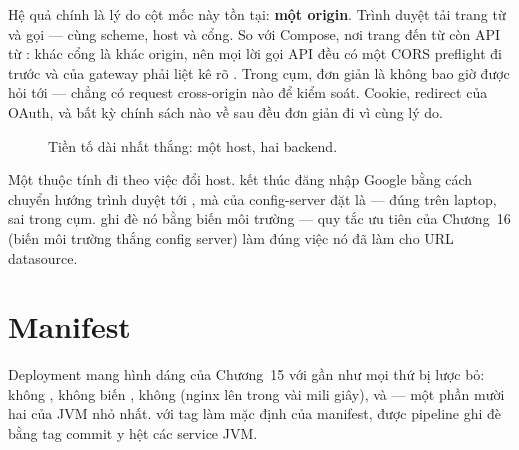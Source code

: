 Hệ quả chính là lý do cột mốc này tồn tại: \textbf{một origin}. Trình
duyệt tải trang từ  và gọi
 --- cùng scheme, host và cổng. So với
Compose, nơi trang đến từ  còn API từ
: khác cổng là khác origin, nên mọi lời gọi API
đều có một CORS preflight đi trước và  của gateway
phải liệt kê rõ . Trong cụm, 
đơn giản là không bao giờ được hỏi tới --- chẳng có request
cross-origin nào để kiểm soát. Cookie, redirect của OAuth, và bất kỳ
chính sách  nào về sau đều đơn giản đi vì cùng lý do.

\begin{figure}[h]
\centering
{}
\caption{Tiền tố dài nhất thắng: một host, hai backend.}
\end{figure}

Một thuộc tính đi theo việc đổi host. 
kết thúc đăng nhập Google bằng cách chuyển hướng trình duyệt tới
, mà 
của config-server đặt là  --- đúng
trên laptop, sai trong cụm.  ghi đè nó bằng
biến môi trường
--- quy tắc ưu tiên của Chương~16 (biến môi trường thắng config
server) làm đúng việc nó đã làm cho URL datasource.

\section{Manifest}

Deployment mang hình dáng của Chương~15 với gần như mọi thứ bị lược
bỏ: không , không biến , không
 (nginx lên trong vài mili giây), và
 --- một phần mười hai
của JVM nhỏ nhất.  với tag
 làm mặc định của manifest, được pipeline ghi đè bằng
tag commit y hệt các service JVM.


